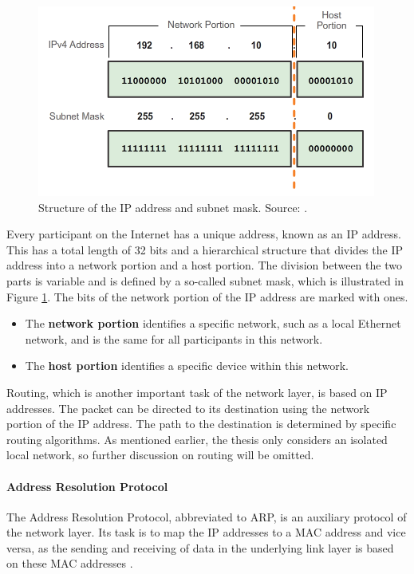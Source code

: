 \begin{figure}[h]
    \centering
    \includegraphics[width=0.8\linewidth]{figures/tcpip_refmodel/image8.png}
    \caption[Structure of the IP address and subnet mask]{Structure of the IP address and subnet mask. Source: \cite{CSE252ImageSubnet}.}
    \label{fig:IPSubnet}
\end{figure}

Every participant on the Internet has a unique address, known as an IP address. This has a total length of 32 bits and a hierarchical structure that divides the IP address into a network portion and a host portion. The division between the two parts is variable and is defined by a so-called subnet mask, which is illustrated in Figure \ref{fig:IPSubnet}. The bits of the network portion of the IP address are marked with ones.

\begin{itemize}
\item The \textbf{network portion} identifies a specific network, such as a local Ethernet network, and is the same for all participants in this network.
\item The \textbf{host portion} identifies a specific device within this network.
\end{itemize}

Routing, which is another important task of the network layer, is based on IP addresses. The packet can be directed to its destination using the network portion of the IP address. The path to the destination is determined by specific routing algorithms. As mentioned earlier, the thesis only considers an isolated local network, so further discussion on routing will be omitted.


\paragraph{Address Resolution Protocol}

The Address Resolution Protocol, abbreviated to ARP, is an auxiliary protocol of the network layer. Its task is to map the IP addresses to a MAC address and vice versa, as the sending and receiving of data in the underlying link layer is based on these MAC addresses \cite{Weigel2021}.


